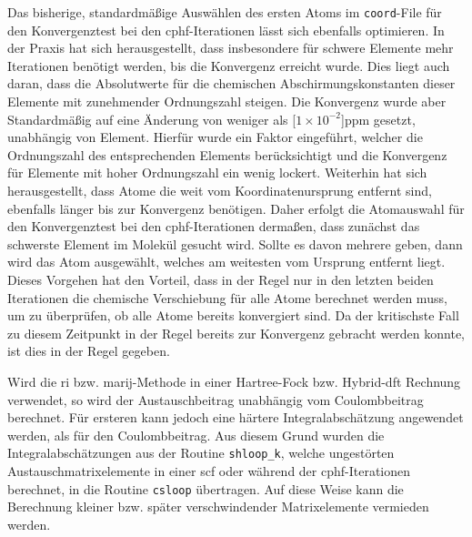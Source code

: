\bigskip
Das bisherige, standardmäßige Auswählen des ersten Atoms im \texttt{coord}-File für den Konvergenztest bei den \ac{cphf}-Iterationen lässt sich ebenfalls optimieren. In der Praxis hat sich herausgestellt, dass insbesondere für schwere Elemente mehr Iterationen benötigt werden, bis die Konvergenz erreicht wurde. Dies liegt auch daran, dass die Absolutwerte für die chemischen Abschirmungskonstanten dieser Elemente mit zunehmender Ordnungszahl steigen. Die Konvergenz wurde aber Standardmäßig auf eine Änderung von weniger als \unit[$1\times 10^{-2}$]{ppm} gesetzt, unabhängig von Element. Hierfür wurde ein Faktor eingeführt, welcher die Ordnungszahl des entsprechenden Elements berücksichtigt und die Konvergenz für Elemente mit hoher Ordnungszahl ein wenig lockert. Weiterhin hat sich herausgestellt, dass Atome die weit vom Koordinatenursprung entfernt sind, ebenfalls länger bis zur Konvergenz benötigen. Daher erfolgt die Atomauswahl für den Konvergenztest bei den \ac{cphf}-Iterationen dermaßen, dass zunächst das schwerste Element im Molekül gesucht wird. Sollte es davon mehrere geben, dann wird das Atom ausgewählt, welches am weitesten vom Ursprung entfernt liegt. Dieses Vorgehen hat den Vorteil, dass in der Regel nur in den letzten beiden Iterationen die chemische Verschiebung für alle Atome berechnet werden muss, um zu überprüfen, ob alle Atome bereits konvergiert sind. Da der kritischste Fall zu diesem Zeitpunkt in der Regel bereits zur Konvergenz gebracht werden konnte, ist dies in der Regel gegeben.

\bigskip
Wird die \ac{ri} bzw. \ac{marij}-Methode in einer Hartree-Fock bzw. Hybrid-\ac{dft} Rechnung verwendet, so wird der Austauschbeitrag unabhängig vom Coulombbeitrag berechnet. Für ersteren kann jedoch eine härtere Integralabschätzung angewendet werden, als für den Coulombbeitrag. Aus diesem Grund wurden die Integralabschätzungen aus der Routine \texttt{shloop\_k}, welche ungestörten Austauschmatrixelemente in einer \ac{scf} oder während der \ac{cphf}-Iterationen berechnet, in die Routine \texttt{csloop} übertragen. Auf diese Weise kann die Berechnung kleiner bzw. später verschwindender Matrixelemente vermieden werden. 

